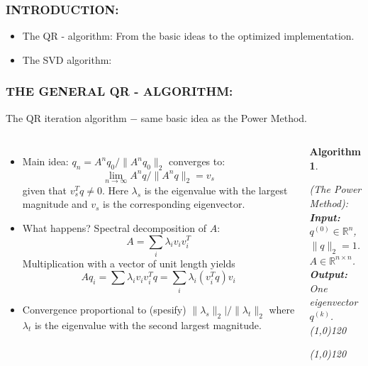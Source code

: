 \documentclass[a4paper,8pt]{beamer} %
\newcommand{\norm}[1]{\lVert{#1}\rVert}
\newtheorem{algo}{Algorithm}%
\begin{document}



\begin{frame}  %
\frametitle{INTRODUCTION:}
\begin{itemize}
\item The QR - algorithm: From the basic ideas to the optimized implementation.
\item The SVD algorithm: 
\end{itemize}
\end{frame} %

\begin{frame} %
\frametitle{THE GENERAL QR - ALGORITHM:}
The QR iteration algorithm $-$ same basic idea as the Power Method.
%
%
\begin{columns}
%
%
\column{7cm}
\begin{itemize}
	\item Main idea: $q_n = A^n q_0 /  \norm{A^n q_0}_2$ converges to: 
		\[ \lim_{n\to\infty} A^n q / \norm{A^nq}_2 = v_s \]
		given that $v_s^Tq\neq0$.
		Here $\lambda_s$ is the eigenvalue with the largest magnitude
		and $v_s$ is the corresponding eigenvector. 
	\item What happens? Spectral decomposition of $A$:
		\[ A = \sum_i\lambda_i v_iv_i^T \]
		 Multiplication with a vector of unit length yields 
		\[ Aq_i = \sum \lambda_i v_iv_i^T q = \sum_i \lambda_i (v_i^Tq) v_i \]
	\item Convergence proportional to (spesify) $\norm{\lambda_s}_2|/\norm{\lambda_t}_2$
		where $\lambda_t$ is the eigenvalue with the second largest magnitude.
\end{itemize}
%
%
\column{5cm}
\begin{algo}
\begin{footnotesize}
{
%
	(The Power Method):
%
}\\
\textbf{Input: }
{
%
	\\$q^{(0)}\in\mathbb R^n$, $\norm{q}_2=1$.
	\\$A\in\mathbb R^{n\times n}$.
%
}\\
\textbf{Output: }
{
%
	\\One eigenvector $q^{(k)}$.
%
}\\
\line(1,0){120}
\begin{algorithmic}
%
	\State{$q^{(k)}\gets z/\norm{z}_2$}
\EndFor{}
%
\end{algorithmic}
\line(1,0){120}
\end{footnotesize}
\end{algo}
\end{columns}	
\end{frame} %
\end{document}
